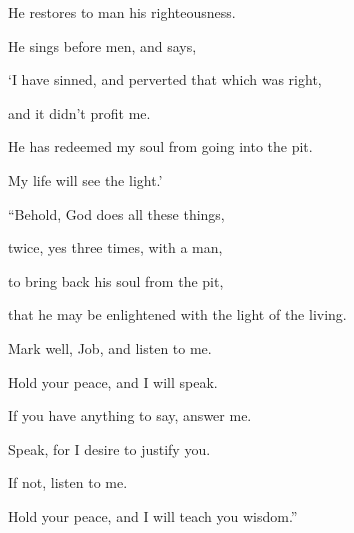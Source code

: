 {\par }{\QB He restores to man his righteousness.
\par }{\Q {}He sings before men, and says,
\par }{\QB ‘I have sinned, and perverted that which was right,
\par }{\QB and it didn’t profit me.
\par }{\Q {}He has redeemed my soul from going into the pit.
\par }{\QB My life will see the light.’
\par }{\BB \par }{\Q {}“Behold, God does all these things,
\par }{\QB twice, yes three times, with a man,
\par }{\Q {}to bring back his soul from the pit,
\par }{\QB that he may be enlightened with the light of the living.
\par }{\Q {}Mark well, Job, and listen to me.
\par }{\QB Hold your peace, and I will speak.
\par }{\Q {}If you have anything to say, answer me.
\par }{\QB Speak, for I desire to justify you.
\par }{\Q {}If not, listen to me.
\par }{\QB Hold your peace, and I will teach you wisdom.”
\par }{\BB \par }
